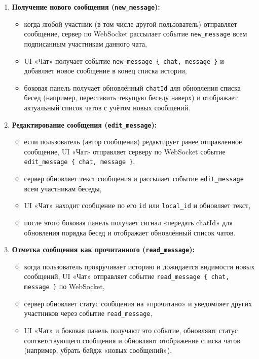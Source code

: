 \begin{enumerate}
    \item \textbf{Получение нового сообщения (\texttt{new\_message}):}
    \begin{itemize}
        \item когда любой участник (в том числе другой пользователь) отправляет сообщение, сервер по WebSocket рассылает событие \texttt{new\_message} всем подписанным участникам данного чата,
        \item UI «Чат» получает событие \texttt{new\_message \{ chat, message \}} и добавляет новое сообщение в конец списка истории,
        \item боковая панель получает обновлённый \texttt{chatId} для обновления списка бесед (например, переставить текущую беседу наверх) и отображает актуальный список чатов с учётом новых сообщений.
    \end{itemize}

    \item \textbf{Редактирование сообщения (\texttt{edit\_message}):}
    \begin{itemize}
        \item если пользователь (автор сообщения) редактирует ранее отправленное сообщение, UI «Чат» отправляет серверу по WebSocket событие \texttt{edit\_message \{ chat, message \}},
        \item сервер обновляет текст сообщения и рассылает событие \texttt{edit\_message} всем участникам беседы,
        \item UI «Чат» находит сообщение по его \texttt{id} или \texttt{local\_id} и обновляет текст,
        \item после этого боковая панель получает сигнал «передать chatId» для обновления порядка бесед и отображает обновлённый список чатов.
    \end{itemize}

    \item \textbf{Отметка сообщения как прочитанного (\texttt{read\_message}):}
    \begin{itemize}
        \item когда пользователь прокручивает историю и дожидается видимости новых сообщений, UI «Чат» отправляет событие \texttt{read\_message \{ chat, message \}} по WebSocket,
        \item сервер обновляет статус сообщения на «прочитано» и уведомляет других участников через событие \texttt{read\_message},
        \item UI «Чат» и боковая панель получают это событие, обновляют статус соответствующего сообщения и обновляют отображение списка чатов (например, убрать бейдж «новых сообщений»).
    \end{itemize}


\end{enumerate}
